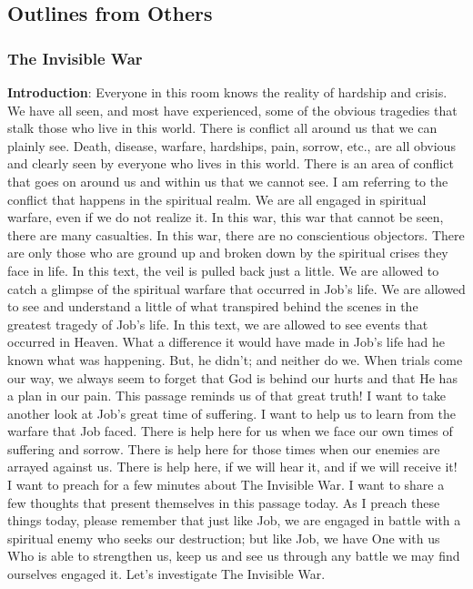 \subsection{Outlines from Others}

\subsubsection{The Invisible War}
\textbf{Introduction}: Everyone in this room knows the reality of hardship and crisis. We have all seen, and most have experienced, some of the obvious tragedies that stalk those who live in this world. There is conflict all around us that we can plainly see. Death, disease, warfare, hardships, pain, sorrow, etc., are all obvious and clearly seen by everyone who lives in this world.  There is an area of conflict that goes on around us and within us that we cannot see. I am referring to the conflict that happens in the spiritual realm. We are all engaged in spiritual warfare, even if we do not realize it. In this war, this war that cannot be seen, there are many casualties. In this war, there are no conscientious objectors. There are only those who are ground up and broken down by the spiritual crises they face in life.   In this text, the veil is pulled back just a little. We are allowed to catch a glimpse of the spiritual warfare that occurred in Job's life. We are allowed to see and understand a little of what transpired behind the scenes in the greatest tragedy of Job's life.   In this text, we are allowed to see events that occurred in Heaven. What a difference it would have made in Job's life had he known what was happening. But, he didn’t; and neither do we.  When trials come our way, we always seem to forget that God is behind our hurts and that He has a plan in our pain. This passage reminds us of that great truth!  I want to take another look at Job's great time of suffering. I want to help us to learn from the warfare that Job faced. There is help here for us when we face our own times of suffering and sorrow. There is help here for those times when our enemies are arrayed against us. There is help here, if we will hear it, and if we will receive it!  I want to preach for a few minutes about The Invisible War. I want to share a few thoughts that present themselves in this passage today. As I preach these things today, please remember that just like Job, we are engaged in battle with a spiritual enemy who seeks our destruction; but like Job, we have One with us Who is able to strengthen us, keep us and see us through any battle we may find ourselves engaged it. Let's investigate The Invisible War.
